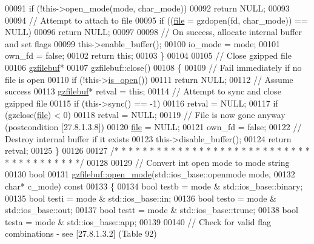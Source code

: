 \begin{DoxyCode}
00091   \textcolor{keywordflow}{if} (!this->open\_mode(mode, char\_mode))
00092     \textcolor{keywordflow}{return} NULL;
00093 
00094   \textcolor{comment}{// Attempt to attach to file}
00095   \textcolor{keywordflow}{if} ((\hyperlink{structfile}{file} = gzdopen(fd, char\_mode)) == NULL)
00096     \textcolor{keywordflow}{return} NULL;
00097 
00098   \textcolor{comment}{// On success, allocate internal buffer and set flags}
00099   this->enable\_buffer();
00100   io\_mode = mode;
00101   own\_fd = \textcolor{keyword}{false};
00102   \textcolor{keywordflow}{return} \textcolor{keyword}{this};
00103 \}
00104 
00105 \textcolor{comment}{// Close gzipped file}
00106 \hyperlink{classgzfilebuf}{gzfilebuf}*
00107 gzfilebuf::close()
00108 \{
00109   \textcolor{comment}{// Fail immediately if no file is open}
00110   \textcolor{keywordflow}{if} (!this->\hyperlink{classgzofstream_acb1c9c6dccaf41bc5e44c2263ea48de3}{is\_open}())
00111     \textcolor{keywordflow}{return} NULL;
00112   \textcolor{comment}{// Assume success}
00113   \hyperlink{classgzfilebuf}{gzfilebuf}* retval = \textcolor{keyword}{this};
00114   \textcolor{comment}{// Attempt to sync and close gzipped file}
00115   \textcolor{keywordflow}{if} (this->sync() == -1)
00116     retval = NULL;
00117   \textcolor{keywordflow}{if} (gzclose(\hyperlink{structfile}{file}) < 0)
00118     retval = NULL;
00119   \textcolor{comment}{// File is now gone anyway (postcondition [27.8.1.3.8])}
00120   \hyperlink{structfile}{file} = NULL;
00121   own\_fd = \textcolor{keyword}{false};
00122   \textcolor{comment}{// Destroy internal buffer if it exists}
00123   this->disable\_buffer();
00124   \textcolor{keywordflow}{return} retval;
00125 \}
00126 
00127 \textcolor{comment}{/* * * * * * * * * * * * * * * * * * * * * * * * * * * * * * * * * * * * * * */}
00128 
00129 \textcolor{comment}{// Convert int open mode to mode string}
00130 \textcolor{keywordtype}{bool}
00131 \hyperlink{classgzfilebuf_ab0c2c304183e591706681af26add3da2}{gzfilebuf::open\_mode}(std::ios\_base::openmode mode,
00132                      \textcolor{keywordtype}{char}* c\_mode)\textcolor{keyword}{ const}
00133 \textcolor{keyword}{}\{
00134   \textcolor{keywordtype}{bool} testb = mode & std::ios\_base::binary;
00135   \textcolor{keywordtype}{bool} testi = mode & std::ios\_base::in;
00136   \textcolor{keywordtype}{bool} testo = mode & std::ios\_base::out;
00137   \textcolor{keywordtype}{bool} testt = mode & std::ios\_base::trunc;
00138   \textcolor{keywordtype}{bool} testa = mode & std::ios\_base::app;
00139 
00140   \textcolor{comment}{// Check for valid flag combinations - see [27.8.1.3.2] (Table 92)}

\end{DoxyCode}

